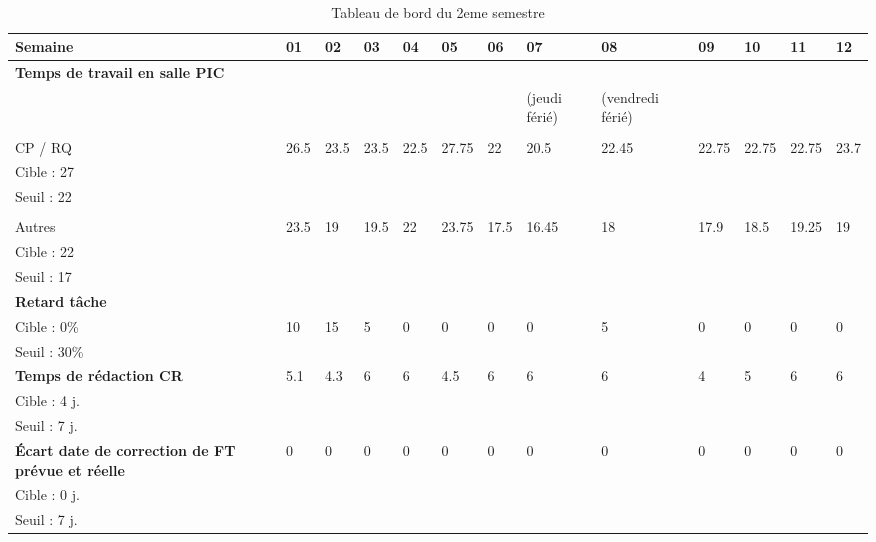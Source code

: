 \documentclass[asi,sansVersion]{picInsa}
\begin{document}
	\newpage
	\begin{landscape}
	\begin{center}
		\LARGE
		\textsc{
			\TB{}\\
		}
	\end{center}
	\vspace{0.5cm}


		\begin{longtable}{|p{2.2cm}|p{1cm}|p{1cm}|p{1cm}|p{1cm}|p{1cm}|p{1cm}|p{1cm}|p{1cm}|p{1cm}|p{1cm}|p{1cm}|p{1cm}|}
		\caption{Tableau de bord du 2eme semestre}\\\hline
			\hline
			\rowcolor[gray]{0.85}
			Semaine & 01 & 02 & 03 & 04 & 05 & 06 & 07 & 08 & 09 & 10 & 11 & 12 \\\hline
			\footnotesize
			\textbf{Temps de travail en salle PIC} & & & & & & & & & & & &\\ 
			& & & & & & & (jeudi férié)& (vendredi férié) & & & &\\
			& & & & & & & & & & & &\\
			CP / RQ & 26.5 & 23.5 & 23.5 & 22.5 & 27.75 & 22 & 20.5 & 22.45 & 22.75 & 22.75 & 22.75 & 23.7\\
			Cible : 27 & & & & & & & & & & & &\\
			Seuil : 22 & & & & & & & & & & & &\\
			& & & & & & & & & & & &\\
			Autres  & 23.5 & 19 & 19.5 & 22 & 23.75 & 17.5 & 16.45 & 18 & 17.9 & 18.5 & 19.25 & 19\\
			Cible : 22  & & & & & & & & & & & &\\
			Seuil : 17 & & & & & & & & & & & &\\\hline
			\footnotesize
			\textbf{Retard tâche} & & & & & & & & & & & &\\
			Cible : 0\% & 10 & 15 & 5 & 0 & 0 & 0 & 0 & 5 & 0 & 0 & 0 & 0\\
			Seuil : 30\% & & & & & & & & & & & &\\\hline
			\textbf{Temps de rédaction CR} & 5.1 & 4.3 & 6 & 6 & 4.5 & 6 & 6 & 6 & 4 & 5 & 6 & 6\\
			Cible : 4 j. & & & & & & & & & & & &\\
			Seuil : 7 j. & & & & & & & & & & & &\\\hline
			\footnotesize
			\textbf{Écart date de correction de FT prévue et réelle} & 0 & 0 & 0 & 0 & 0 & 0 & 0 & 0 & 0 & 0 & 0 & 0\\
			Cible : 0 j. & & & & & & & & & & & &\\
			Seuil : 7 j. & & & & & & & & & & & &\\\hline
			
		\end{longtable}
	\end{landscape}
\end{document}
